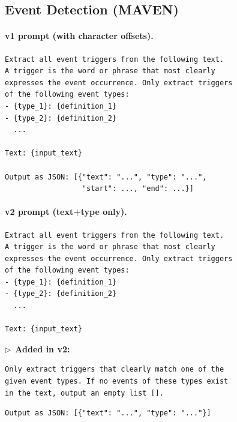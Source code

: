 \subsection{Event Detection (MAVEN)}

\paragraph{v1 prompt (with character offsets).}

\begin{small}
\begin{lstlisting}
Extract all event triggers from the following text.
A trigger is the word or phrase that most clearly
expresses the event occurrence. Only extract triggers
of the following event types:
- {type_1}: {definition_1}
- {type_2}: {definition_2}
  ...

Text: {input_text}

Output as JSON: [{"text": "...", "type": "...",
                  "start": ..., "end": ...}]
\end{lstlisting}
\end{small}

\paragraph{v2 prompt (text+type only).}

\begin{small}
\begin{lstlisting}
Extract all event triggers from the following text.
A trigger is the word or phrase that most clearly
expresses the event occurrence. Only extract triggers
of the following event types:
- {type_1}: {definition_1}
- {type_2}: {definition_2}
  ...

Text: {input_text}
\end{lstlisting}
\end{small}
\vspace{-0.5em}
\noindent$\triangleright$~\textbf{Added in v2:}
\begin{small}
\begin{lstlisting}
Only extract triggers that clearly match one of the
given event types. If no events of these types exist
in the text, output an empty list [].
\end{lstlisting}
\end{small}
\vspace{-0.5em}
\begin{small}
\begin{lstlisting}
Output as JSON: [{"text": "...", "type": "..."}]
\end{lstlisting}
\end{small}

